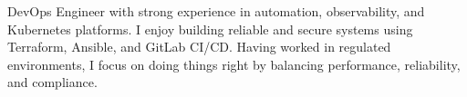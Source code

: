 \par{
DevOps Engineer with strong experience in automation, observability, and Kubernetes platforms. I enjoy building reliable and secure systems using Terraform, Ansible, and GitLab CI/CD.
Having worked in regulated environments, I focus on doing things right by balancing performance, reliability, and compliance.
}